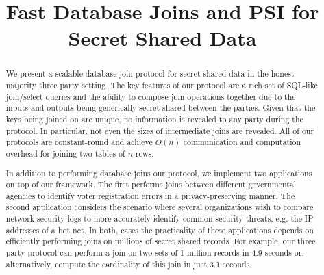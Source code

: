 \documentclass[11pt,letterpaper]{article}
\begin{document}
\title{Fast Database Joins and PSI for Secret Shared Data}
\begin{abstract}
We present a scalable database join protocol for secret shared data in the honest majority three party setting. The key features of our protocol are a rich set of SQL-like join/select queries and the ability to compose join operations together due to the inputs and outputs being generically secret shared between the parties. Given that the keys being joined on are unique, no information is revealed to any party during the protocol. In particular, not even the sizes of intermediate joins are revealed. All of our protocols are constant-round and achieve $O(n)$ communication and computation overhead for joining two tables of $n$ rows. 

In addition to performing database joins our protocol, we implement two applications on top of our framework. The first performs joins between different governmental agencies to identify voter registration errors in a privacy-preserving manner. The second application considers the scenario where several organizations wish to compare network security logs to more accurately identify common security threats, e.g. the IP addresses of a bot net. In both, cases the practicality of these applications depends on efficiently performing joins on millions of secret shared records. For example, our three party protocol can perform a join on two sets of 1 million records in 4.9 seconds or, alternatively, compute the cardinality of this join in just 3.1 seconds. 
\end{abstract}

\iffullversion
\else
\maketitle
\fi






%












\appendix
\iffullversion
\else

\fi
\end{document}
